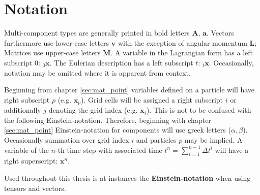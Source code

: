 \documentclass[m,times]{cgMA}
\begin{document}
\section{Notation}\label{sec:notation}
Multi-component types are generally printed in bold letters $\boldsymbol{A}$, $\boldsymbol{a}$. Vectors furthermore use lower-case letters $\boldsymbol{v}$ with the exception of angular momentum $\boldsymbol{L}$; Matrices use upper-case letters $\boldsymbol{M}$. A variable in the Lagrangian form has a left subscript $0$: $ _0{\boldsymbol{x}}$. The Eulerian description has a left subscript $t$: $_t\boldsymbol{x}$. Occasionally, notation may be omitted where it is apparent from context.

Beginning from chapter \ref{sec:mat_point} variables defined on a particle will have right subscript $p$ (e.g. $\boldsymbol{x}_p$). Grid cells will be assigned a right subscript $i$ or additionally $j$ denoting the grid index (e.g. $\boldsymbol{x}_i$). This is not to be confused with the following Einstein-notation. Therefore, beginning with chapter \ref{sec:mat_point} Einstein-notation for components will use greek letters ($\alpha,\beta$). Occasionally summation over grid index $i$ and particles $p$ may be implied. A variable of the $n$-th time step with associated time $t^n = \sum_{i=1}^{n-1} \Delta t^i$ will have a right superscript: $\boldsymbol{x}^n$.

Used throughout this thesis is at instances the \textbf{Einstein-notation} when using tensors and vectors.
\end{document}
